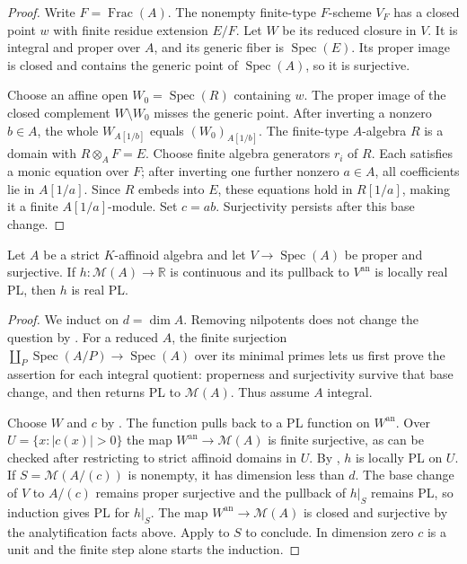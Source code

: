 \begin{proof}
Write $F=\operatorname{Frac}(A)$. The nonempty finite-type $F$-scheme $V_F$ has a closed point $w$ with finite residue extension $E/F$. Let $W$ be its reduced closure in $V$. It is integral and proper over $A$, and its generic fiber is $\operatorname{Spec}(E)$. Its proper image is closed and contains the generic point of $\operatorname{Spec}(A)$, so it is surjective.

Choose an affine open $W_0=\operatorname{Spec}(R)$ containing $w$. The proper image of the closed complement $W\setminus W_0$ misses the generic point. After inverting a nonzero $b\in A$, the whole $W_{A[1/b]}$ equals $(W_0)_{A[1/b]}$. The finite-type $A$-algebra $R$ is a domain with $R\otimes_A F=E$. Choose finite algebra generators $r_i$ of $R$. Each satisfies a monic equation over $F$; after inverting one further nonzero $a\in A$, all coefficients lie in $A[1/a]$. Since $R$ embeds into $E$, these equations hold in $R[1/a]$, making it a finite $A[1/a]$-module. Set $c=ab$. Surjectivity persists after this base change.
\end{proof}

\begin{proposition}\label{prop:supplied-p061-proper-algebraic-descent}
Let $A$ be a strict $K$-affinoid algebra and let $V\to\operatorname{Spec}(A)$ be proper and surjective. If $h:\mathcal M(A)\to\mathbb R$ is continuous and its pullback to $V^{\mathrm{an}}$ is locally real PL, then $h$ is real PL.
\end{proposition}

\begin{proof}
We induct on $d=\dim A$. Removing nilpotents does not change the question by . For a reduced $A$, the finite surjection $\coprod_P\operatorname{Spec}(A/P)\to\operatorname{Spec}(A)$ over its minimal primes lets us first prove the assertion for each integral quotient: properness and surjectivity survive that base change, and  then returns PL to $\mathcal M(A)$. Thus assume $A$ integral.

Choose $W$ and $c$ by . The function pulls back to a PL function on $W^{\mathrm{an}}$. Over $U=\{x:|c(x)|>0\}$ the map $W^{\mathrm{an}}\to\mathcal M(A)$ is finite surjective, as can be checked after restricting to strict affinoid domains in $U$. By , $h$ is locally PL on $U$. If $S=\mathcal M(A/(c))$ is nonempty, it has dimension less than $d$. The base change of $V$ to $A/(c)$ remains proper surjective and the pullback of $h|_S$ remains PL, so induction gives PL for $h|_S$. The map $W^{\mathrm{an}}\to\mathcal M(A)$ is closed and surjective by the analytification facts above. Apply  to $S$ to conclude. In dimension zero $c$ is a unit and the finite step alone starts the induction.
\end{proof}

